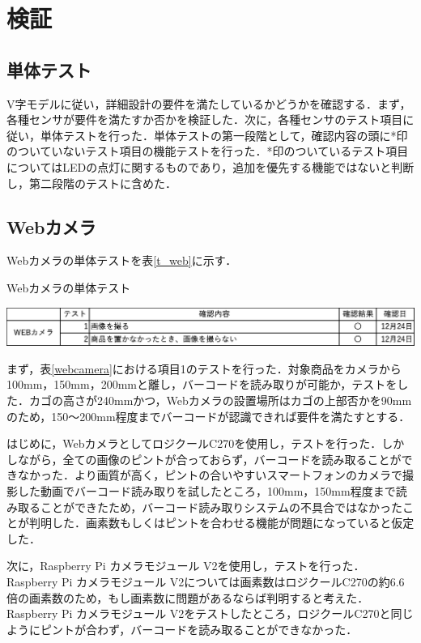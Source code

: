 

\section{検証}

\subsection{単体テスト}

V字モデルに従い，詳細設計の要件を満たしているかどうかを確認する．まず，各種センサが要件を満たすか否かを検証した．次に，各種センサのテスト項目に従い，単体テストを行った．単体テストの第一段階として，確認内容の頭に*印のついていないテスト項目の機能テストを行った．*印のついているテスト項目についてはLEDの点灯に関するものであり，追加を優先する機能ではないと判断し，第二段階のテストに含めた．


\subsection*{Webカメラ}


Webカメラの単体テストを表\ref{t_web}に示す．


\begin{table}[htbp]
\centering
\caption{Webカメラの単体テスト}
\includegraphics[width = 15cm]{./picture/tantai_web.eps}
\label{t_web}
\end{table}

まず，表\ref{webcamera}における項目1のテストを行った．対象商品をカメラから100mm，150mm，200mmと離し，バーコードを読み取りが可能か，テストをした．カゴの高さが240mmかつ，Webカメラの設置場所はカゴの上部否かを90mmのため，150～200mm程度までバーコードが認識できれば要件を満たすとする．

はじめに，WebカメラとしてロジクールC270を使用し，テストを行った．しかしながら，全ての画像のピントが合っておらず，バーコードを読み取ることができなかった．より画質が高く，ピントの合いやすいスマートフォンのカメラで撮影した動画でバーコード読み取りを試したところ，100mm，150mm程度まで読み取ることができたため，バーコード読み取りシステムの不具合ではなかったことが判明した．画素数もしくはピントを合わせる機能が問題になっていると仮定した．

次に，Raspberry Pi カメラモジュール V2を使用し，テストを行った．Raspberry Pi カメラモジュール V2については画素数はロジクールC270の約6.6倍の画素数のため，もし画素数に問題があるならば判明すると考えた．Raspberry Pi カメラモジュール V2をテストしたところ，ロジクールC270と同じようにピントが合わず，バーコードを読み取ることができなかった．

